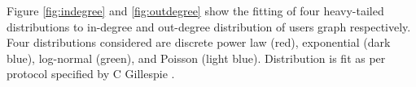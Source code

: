 \documentclass[preprint,12pt]{elsarticle}
\begin{document}
\begin{table}[H]
\centering
\caption{Likelihood ratio tests for comparing out degree distribution (2016-2020)}
\label{outdeg2}
\end{table}

Figure \ref{fig:indegree} and \ref{fig:outdegree} show the fitting of four heavy-tailed distributions to in-degree and out-degree distribution of users graph respectively. Four distributions considered are discrete power law (red), exponential (dark blue), log-normal (green), and Poisson (light blue). Distribution is fit as per protocol specified by C Gillespie  \cite{gillespie2014fitting}. 
\end{document}

